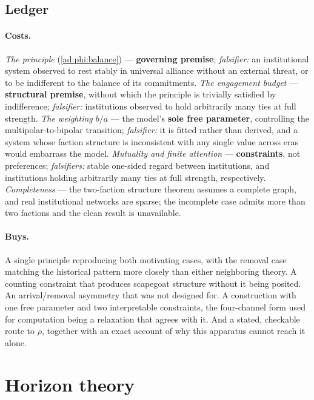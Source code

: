 \documentclass[11pt]{article}
\numberwithin{equation}{section}
\theoremstyle{plain}
\theoremstyle{definition}
\theoremstyle{remark}
\begin{document}
\subsection{Ledger}\label{ad:sub:ledger}

\paragraph{Costs.} \emph{The principle} (\ref{ad:phi:balance}) ---
\textbf{governing premise}; \emph{falsifier:} an institutional system
observed to rest stably in universal alliance without an external
threat, or to be indifferent to the balance of its commitments.
\emph{The engagement budget} --- \textbf{structural premise}, without
which the principle is trivially satisfied by indifference;
\emph{falsifier:} institutions observed to hold arbitrarily many ties
at full strength. \emph{The weighting $b/a$} --- the model's \textbf{sole free
parameter}, controlling the multipolar-to-bipolar transition;
\emph{falsifier:} it is fitted rather than derived, and a system whose
faction structure is inconsistent with any single value across eras
would embarrass the model. \emph{Mutuality and finite attention} ---
\textbf{constraints}, not preferences; \emph{falsifiers:} stable
one-sided regard between institutions, and institutions holding
arbitrarily many ties at full strength, respectively. \emph{Completeness} --- the two-faction
structure theorem assumes a complete graph, and real institutional
networks are sparse; the incomplete case admits more than two factions
and the clean result is unavailable.

\paragraph{Buys.} A single principle reproducing both motivating cases,
with the removal case matching the historical pattern more closely than
either neighboring theory. A counting constraint that produces
scapegoat structure without it being posited. An arrival/removal
asymmetry that was not designed for. A construction with one free
parameter and two interpretable constraints, the four-channel form used
for computation being a relaxation that agrees with it. And a stated,
checkable route to $\rho$, together with an exact account of why this
apparatus cannot reach it alone.

\appendix

\section{Horizon theory}\label{app:horizon}
\end{document}
